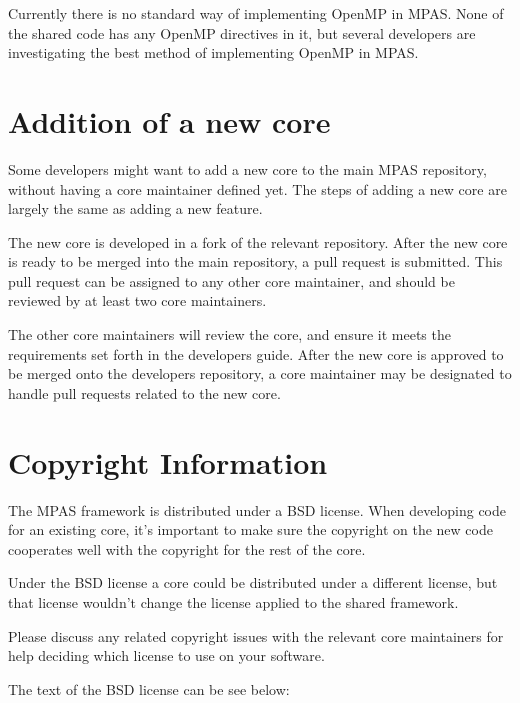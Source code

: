 \documentclass[11pt]{report}
\begin{document}
Currently there is no standard way of implementing OpenMP in MPAS. None of the
shared code has any OpenMP directives in it, but several developers are
investigating the best method of implementing OpenMP in MPAS.

\chapter{Addition of a new core}
Some developers might want to add a new core to the main MPAS repository,
without having a core maintainer defined yet. The steps of adding a new core
are largely the same as adding a new feature. 

The new core is developed in a fork of the relevant repository. After the new
core is ready to be merged into the main repository, a pull request is
submitted. This pull request can be assigned to any other core maintainer, and
should be reviewed by at least two core maintainers.

The other core maintainers will review the core, and ensure it meets the
requirements set forth in the developers guide. After the new core is approved
to be merged onto the developers repository, a core maintainer may be
designated to handle pull requests related to the new core.

\chapter{Copyright Information}
The MPAS framework is distributed under a BSD license. When developing code for
an existing core, it's important to make sure the copyright on the new code
cooperates well with the copyright for the rest of the core.

Under the BSD license a core could be distributed under a different license,
but that license wouldn't change the license applied to the shared framework.

Please discuss any related copyright issues with the relevant core maintainers
for help deciding which license to use on your software.

The text of the BSD license can be see below:
\end{document}
